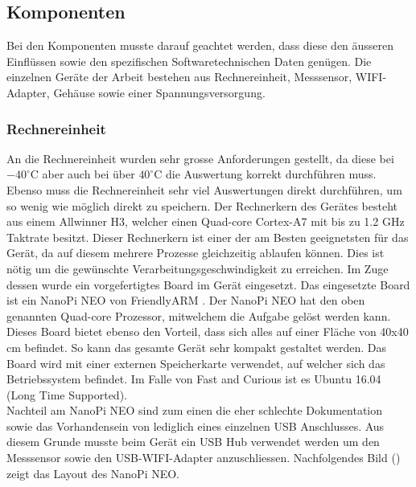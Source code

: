 \subsection{Komponenten}
Bei den Komponenten musste darauf geachtet werden, dass diese den äusseren Einflüssen sowie den spezifischen Softwaretechnischen Daten genügen. Die einzelnen Geräte der Arbeit bestehen aus Rechnereinheit, Messsensor, WIFI-Adapter, Gehäuse sowie einer Spannungsversorgung.

\subsubsection{Rechnereinheit}
An die Rechnereinheit wurden sehr grosse Anforderungen gestellt, da diese bei $-40^\circ\text{C}$ aber auch bei über $40^\circ\text{C}$ die Auswertung korrekt durchführen muss. Ebenso muss die Rechnereinheit sehr viel Auswertungen direkt durchführen, um so wenig wie möglich direkt zu speichern. Der Rechnerkern des Gerätes besteht aus einem Allwinner H3, welcher einen Quad-core Cortex-A7 mit bis zu 1.2 GHz Taktrate besitzt. Dieser Rechnerkern ist einer der am Besten geeignetsten für das Gerät, da auf diesem mehrere Prozesse gleichzeitig ablaufen können. Dies ist nötig um die gewünschte Verarbeitungsgeschwindigkeit zu erreichen. Im Zuge dessen wurde ein vorgefertigtes Board im Gerät eingesetzt. Das eingesetzte Board ist ein NanoPi NEO von FriendlyARM \cite{NanoPi}. Der NanoPi NEO hat den oben genannten Quad-core Prozessor, mitwelchem die Aufgabe gelöst werden kann. \\
Dieses Board bietet ebenso den Vorteil, dass sich alles auf einer Fläche von 40x40 cm  befindet. So kann das gesamte Gerät sehr kompakt gestaltet werden. Das Board wird mit einer externen Speicherkarte verwendet, auf welcher sich das Betriebssystem befindet. Im Falle von Fast and Curious ist es Ubuntu 16.04 (Long Time Supported). \\
Nachteil am NanoPi NEO sind zum einen die eher schlechte Dokumentation sowie das Vorhandensein von lediglich eines einzelnen USB Anschlusses. Aus diesem Grunde musste beim  Gerät ein USB Hub verwendet werden um den Messsensor sowie den USB-WIFI-Adapter anzuschliessen. Nachfolgendes Bild () zeigt das Layout des NanoPi NEO.

